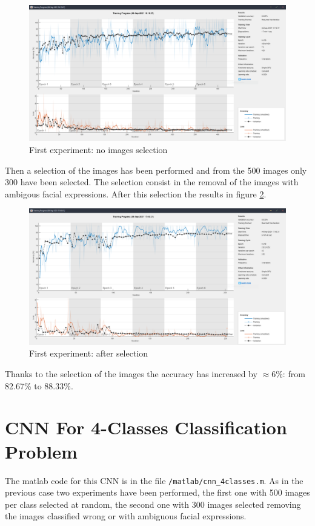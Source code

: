 \documentclass[a4paper]{report}
\begin{document}
	\begin{figure}[htbp]
		\centering
		\includegraphics[scale=0.31]{img/trainingCnnTwoClasses.png}
		\caption{First experiment: no images selection}
		\label{img: trainingCnnTwoClasses}
	\end{figure}

	\noindent Then a selection of the images has been performed and from the 500 images only 300 have been selected. The selection consist in the removal of the images with ambigous facial expressions. After this selection the results in figure \ref{img: trainingCnnTwoClassesAfterSelection}.
	
	\begin{figure}[htbp]
		\centering
		\includegraphics[scale=0.31]{img/trainingCnnTwoClasses_afterSelection.png}
		\caption{First experiment: after selection}
		\label{img: trainingCnnTwoClassesAfterSelection}
	\end{figure}

	\noindent Thanks to the selection of the images the accuracy has increased by $\approx 6\%$: from 82.67\% to 88.33\%.
	 
	\section{CNN For 4-Classes Classification Problem}
	\noindent The matlab code for this CNN is in the file \texttt{/matlab/cnn\_4classes.m}. As in the previous case two experiments have been performed, the first one with 500 images per class selected at random, the second one with 300 images selected removing the images classified wrong or with ambiguous facial expressions.
	
\end{document}

